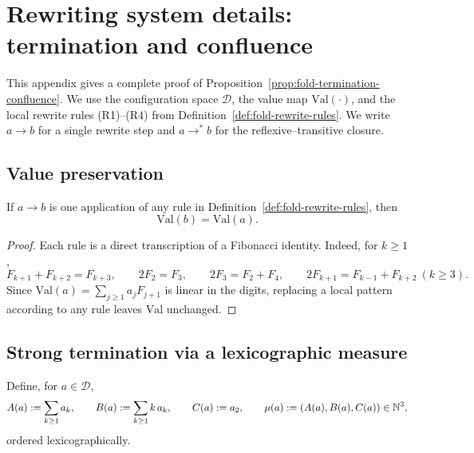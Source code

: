 \section{Rewriting system details: termination and confluence}\label{app:rewrite-system}

This appendix gives a complete proof of Proposition~\ref{prop:fold-termination-confluence}.
We use the configuration space $\mathcal{D}$, the value map $\mathrm{Val}(\cdot)$, and the local rewrite rules (R1)--(R4) from Definition~\ref{def:fold-rewrite-rules}.
We write $a\to b$ for a single rewrite step and $a\to^\ast b$ for the reflexive--transitive closure.

\subsection{Value preservation}\label{app:rewrite-value-preservation}
\begin{lemma}\label{lem:rewrite-preserves-val}
If $a\to b$ is one application of any rule in Definition~\ref{def:fold-rewrite-rules}, then
\[
\mathrm{Val}(b)=\mathrm{Val}(a).
\]
\end{lemma}
\begin{proof}
Each rule is a direct transcription of a Fibonacci identity.
Indeed, for $k\ge 1$,
\[
F_{k+1}+F_{k+2}=F_{k+3},\qquad
2F_2=F_3,\qquad
2F_3=F_2+F_4,\qquad
2F_{k+1}=F_{k-1}+F_{k+2}\ (k\ge 3).
\]
Since $\mathrm{Val}(a)=\sum_{j\ge 1}a_jF_{j+1}$ is linear in the digits, replacing a local pattern according to any rule leaves $\mathrm{Val}$ unchanged.
\end{proof}

\subsection{Strong termination via a lexicographic measure}\label{app:rewrite-measure}
Define, for $a\in\mathcal{D}$,
\[
A(a):=\sum_{k\ge 1} a_k,\qquad
B(a):=\sum_{k\ge 1} k\,a_k,\qquad
C(a):=a_2,
\qquad
\mu(a):=(A(a),B(a),C(a))\in\mathbb{N}^3,
\]
ordered lexicographically.

